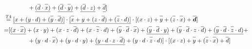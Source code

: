 \documentclass{article}
\newcommand*{\oline}[1]{\overline{#1\mathstrut}}
\newcommand{\bigspace}{\quad\quad\quad\quad}
\begin{document}
\begin{align*}
&\bigspace +\underline{(\oline{d} \cdot \oline{x})} + \underline{(\oline{d} \cdot \oline{y})}  + \underline{(\oline{d} \cdot z)} + \underline{\oline{d}} ] \\
&\overset{T4}{=}  \underline{[x +  (y \cdot d)+  (\oline{y} \cdot \oline{d})]} \cdot \underline{[\oline{x}+y+(z \cdot \oline{d})+ (\oline{z} \cdot d)]}  \cdot [(x  \cdot z) + \oline{y} +(\oline{z} \cdot \oline{x})  + \bm{\oline{d}} ] \\
&{=} [ \underline{(x \cdot \oline{x})} + (x \cdot y)+  (x \cdot z \cdot \oline{d}) + (x \cdot \oline{z} \cdot d) +  (\oline{y} \cdot \oline{d} \cdot \oline{x}) +\underline{(\oline{y} \cdot \oline{d} \cdot y)} +   (\oline{y} \cdot \oline{d} \cdot z \cdot \oline{d}) + \underline{(\oline{y} \cdot \oline{d} \cdot \oline{z} \cdot d )} + \\
&\bigspace + (y \cdot d \cdot \oline{x}) + (y \cdot d \cdot y) +  \underline{(y \cdot d \cdot z \cdot \oline{d})} +(y \cdot d \cdot \oline{z} \cdot d) ] \cdot [(x  \cdot z) + \oline{y} +(\oline{z} \cdot \oline{x})  + \oline{d} ] \\
\end{align*}
\newpage
\end{document}
